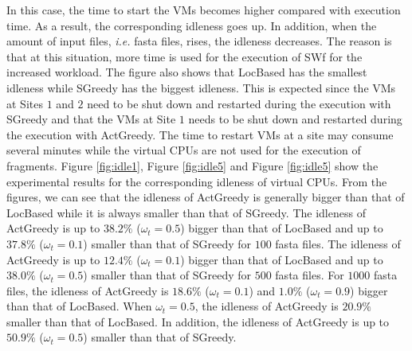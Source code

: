 In this case, the time to start the VMs becomes higher compared with execution time. As a result, the corresponding idleness goes up. In addition, when the amount of input files, \textit{i.e.} fasta files, rises, the idleness decreases. The reason is that at this situation, more time is used for the execution of SWf for the increased workload. The figure also shows that LocBased has the smallest idleness while SGreedy has the biggest idleness. This is expected since the VMs at Sites $1$ and $2$ need to be shut down and restarted during the execution with SGreedy and that the VMs at Site $1$ needs to be shut down and restarted during the execution with ActGreedy. The time to restart VMs at a site may consume several minutes while the virtual CPUs are not used for the execution of fragments. Figure \ref{fig:idle1}, Figure \ref{fig:idle5} and Figure \ref{fig:idle5} show the experimental results for the corresponding idleness of virtual CPUs. From the figures, we can see that the idleness of ActGreedy is generally bigger than that of LocBased while it is always smaller than that of SGreedy. The idleness of ActGreedy is up to $38.2\%$ ($\omega_t = 0.5$) bigger than that of LocBased and up to $37.8\%$ ($\omega_t = 0.1$) smaller than that of SGreedy for $100$ fasta files. The idleness of ActGreedy is up to $12.4\%$ ($\omega_t = 0.1$) bigger than that of LocBased and up to $38.0\%$ ($\omega_t = 0.5$) smaller than that of SGreedy for $500$ fasta files. For $1000$ fasta files, the idleness of ActGreedy is $18.6\%$ ($\omega_t = 0.1$) and $1.0\%$ ($\omega_t = 0.9$) bigger than that of LocBased. When $\omega_t = 0.5$, the idleness of ActGreedy is $20.9\%$ smaller than that of LocBased. In addition, the idleness of ActGreedy is up to $50.9\%$ ($\omega_t = 0.5$) smaller than that of SGreedy.
